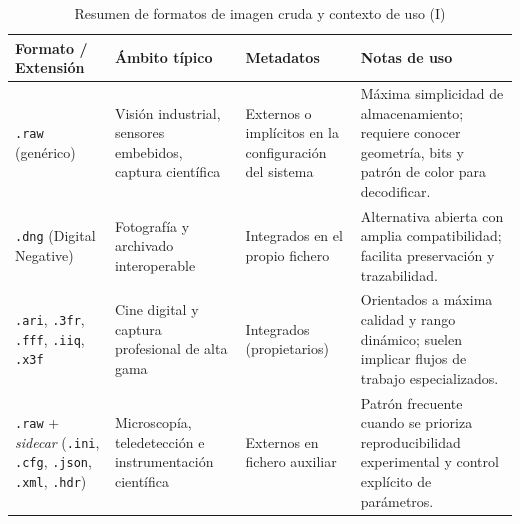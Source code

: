 \begin{table}[htbp]
    \centering
    \footnotesize
    \renewcommand{\arraystretch}{1.15}
    \setlength{\tabcolsep}{4pt}
    \begin{tabularx}{\textwidth}{|>{\hsize=0.95\hsize\raggedright\arraybackslash}X|>{\hsize=1.00\hsize\raggedright\arraybackslash}X|>{\hsize=0.85\hsize\raggedright\arraybackslash}X|>{\hsize=1.20\hsize\raggedright\arraybackslash}X|}
        \hline
        \rowcolor[gray]{0.90}
        \textbf{Formato / Extensión} & \textbf{Ámbito típico} & \textbf{Metadatos} & \textbf{Notas de uso} \\
        \hline
        \texttt{.raw} (genérico) & Visión industrial, sensores embebidos, captura científica & Externos o implícitos en la configuración del sistema & Máxima simplicidad de almacenamiento; requiere conocer geometría, bits y patrón de color para decodificar. \\
        \hline
        \texttt{.dng} (Digital Negative) & Fotografía y archivado interoperable & Integrados en el propio fichero & Alternativa abierta con amplia compatibilidad; facilita preservación y trazabilidad. \\
        \hline
        \texttt{.ari}, \texttt{.3fr}, \texttt{.fff}, \texttt{.iiq}, \texttt{.x3f} & Cine digital y captura profesional de alta gama & Integrados (propietarios) & Orientados a máxima calidad y rango dinámico; suelen implicar flujos de trabajo especializados. \\
        \hline
        \texttt{.raw} + \textit{sidecar} (\texttt{.ini}, \texttt{.cfg}, \texttt{.json}, \texttt{.xml}, \texttt{.hdr}) & Microscopía, teledetección e instrumentación científica & Externos en fichero auxiliar & Patrón frecuente cuando se prioriza reproducibilidad experimental y control explícito de parámetros. \\
        \hline
    \end{tabularx}
    \caption{Resumen de formatos de imagen cruda y contexto de uso (I)}
    \label{tab:appendix_d_raw_formats_common_i}
\end{table}

